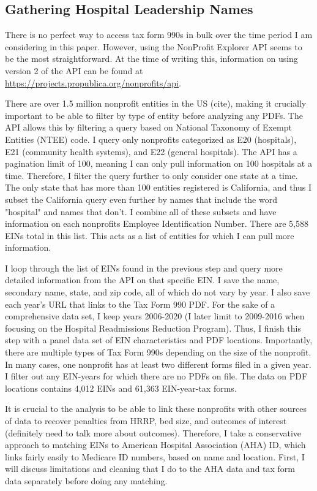 \documentclass[12pt]{article}
\begin{document}
\subsection{Gathering Hospital Leadership Names}

There is no perfect way to access tax form 990s in bulk over the time period I am considering in this paper. However, using the NonProfit Explorer API seems to be the most straightforward. At the time of writing this, information on using version 2 of the API can be found at \hyperlink{https://projects.propublica.org/nonprofits/api}{https://projects.propublica.org/nonprofits/api}. 
    
There are over 1.5 million nonprofit entities in the US (cite), making it crucially important to be able to filter by type of entity before analyzing any PDFs. The API allows this by filtering a query based on National Taxonomy of Exempt Entities (NTEE) code. I query only nonprofits categorized as E20 (hospitals), E21 (community health systems), and E22 (general hospitals). The API has a pagination limit of 100, meaning I can only pull information on 100 hospitals at a time. Therefore, I filter the query further to only consider one state at a time. The only state that has more than 100 entities registered is California, and thus I subset the California query even further by names that include the word "hospital" and names that don't. I combine all of these subsets and have information on each nonprofits Employee Identification Number. There are 5,588 EINs total in this list. This acts as a list of entities for which I can pull more information. 

I loop through the list of EINs found in the previous step and query more detailed information from the API on that specific EIN. I save the name, secondary name, state, and zip code, all of which do not vary by year. I also save each year's URL that links to the Tax Form 990 PDF. For the sake of a comprehensive data set, I keep years 2006-2020 (I later limit to 2009-2016 when focusing on the Hospital Readmissions Reduction Program). Thus, I finish this step with a panel data set of EIN characteristics and PDF locations. Importantly, there are multiple types of Tax Form 990s depending on the size of the nonprofit. In many cases, one nonprofit has at least two different forms filed in a given year. I filter out any EIN-years for which there are no PDFs on file. The data on PDF locations contains 4,012 EINs and 61,363 EIN-year-tax forms.

It is crucial to the analysis to be able to link these nonprofits with other sources of data to recover penalties from HRRP, bed size, and outcomes of interest (definitely need to talk more about outcomes). Therefore, I take a conservative approach to matching EINs to American Hospital Association (AHA) ID, which links fairly easily to Medicare ID numbers, based on name and location. First, I will discuss limitations and cleaning that I do to the AHA data and tax form data separately before doing any matching. 
\end{document}
